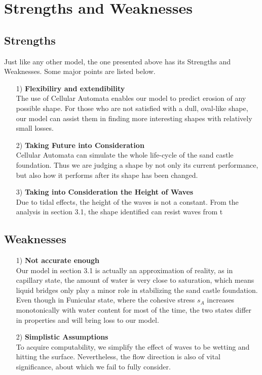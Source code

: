 \documentclass[12pt]{article}
\begin{document}
\section{Strengths and Weaknesses}
\subsection{Strengths}
Just like any other model, the one presented above has its Strengths and Weaknesses. Some major points are listed below.
\begin{itemize}
    \item [1)]
          \textbf{Flexibiliry and extendibility}\\
          The use of Cellular Automata enables our model to predict erosion of any possible shape. For those who are not satisfied with a dull, oval-like shape, our model can assist them in finding more interesting shapes with relatively small losses.
    \item [2)]
          \textbf{Taking Future into Consideration}\\
          Cellular Automata can simulate the whole life-cycle of the sand castle foundation. Thus we are judging a shape by not only its current performance, but also how it performs after its shape has been changed.
    \item [3)]
          \textbf{Taking into Consideration the Height of Waves}\\
          Due to tidal effects, the height of the waves is not a constant. From the analysis in section 3.1, the shape identified can resist waves from t
\end{itemize}
\subsection{Weaknesses}
\begin{itemize}
    \item [1)]
          \textbf{Not accurate enough}\\
          Our model in section 3.1 is actually an approximation of reality, as in capillary state, the amount of water is very close to saturation, which means liquid bridges only play a minor role in stabilizing the sand castle foundation. Even though in Funicular state, where the cohesive stress $s_A$ increases monotonically with water content for most of the time, the two states differ in properties and will bring loss to our model.
    \item [2)]
          \textbf{Simplistic Assumptions}\\
          To acquire computability, we simplify the effect of waves to be wetting and hitting the surface. Nevertheless, the flow direction is also of vital significance, about which we fail to fully consider.

\end{itemize}
\end{document}
